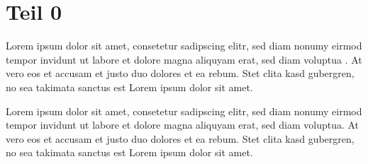 %
%
%
%
\section{Teil 0\label{mellin:section:teil0}}
Lorem ipsum dolor sit amet, consetetur sadipscing elitr, sed diam
nonumy eirmod tempor invidunt ut labore et dolore magna aliquyam
erat, sed diam voluptua \cite{mellin:bibtex}.
At vero eos et accusam et justo duo dolores et ea rebum.
Stet clita kasd gubergren, no sea takimata sanctus est Lorem ipsum
dolor sit amet.

Lorem ipsum dolor sit amet, consetetur sadipscing elitr, sed diam
nonumy eirmod tempor invidunt ut labore et dolore magna aliquyam
erat, sed diam voluptua.
At vero eos et accusam et justo duo dolores et ea rebum.  Stet clita
kasd gubergren, no sea takimata sanctus est Lorem ipsum dolor sit
amet.


